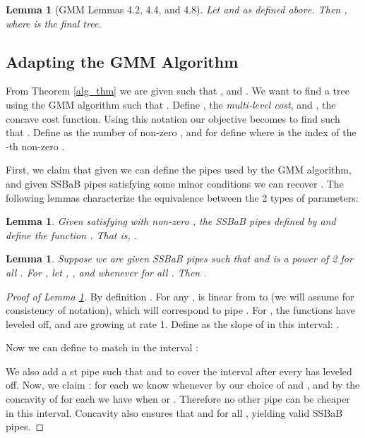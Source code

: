 \documentclass[11pt]{article}
\newtheorem{lem}[thm]{Lemma}
\begin{document}
\begin{lem}[GMM Lemmas 4.2, 4.4, and 4.8] \label{gmm_cost_lem}  Let  and  as defined above.
Then , where  is the final tree.
\end{lem}

\subsection{Adapting the GMM Algorithm}

From Theorem \ref{alg_thm} we are given  such that , and .  We want to find a tree  using the GMM algorithm such that . 
Define , the \emph{multi-level cost}, and , the concave cost function.  Using this notation our objective becomes to find  such that .  Define  as the number of non-zero , and for  define   where  is the index of the -th non-zero . 

First, we claim that given  we can define the pipes  used by the GMM algorithm, and given SSBaB pipes satisfying some minor conditions we can recover .  The following lemmas characterize the equivalence between the 2 types of parameters:

\begin{lem} \label{alphatodelta_lem}
Given  satisfying  with  non-zero , the SSBaB pipes  defined by  and  define the function .  That is, .
\end{lem}

\begin{lem} \label{deltatoalpha_lem}
Suppose we are given  SSBaB pipes  such that  and  is a power of 2 for all . For , let , , and  whenever  for all .  Then .
\end{lem}

\begin{proof}[Proof of Lemma \ref{alphatodelta_lem}]
By definition .  For any ,  is linear from  to  (we will assume  for consistency of notation), which will correspond to pipe .  For , the functions  have leveled off, and  are growing at rate 1.  Define  as the slope of  in this interval: .

Now we can define  to match  in the interval :

We also add a st pipe such that  and  to cover the interval after every  has leveled off.
Now, we claim :  for each  we know  whenever  by our choice of  and , and by the concavity of  for each  we have  when  or .  Therefore no other pipe can be cheaper in this interval.
Concavity also ensures that  and  for all , yielding valid SSBaB pipes.
\end{proof}
\end{document}

